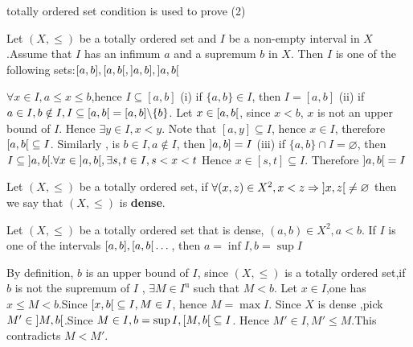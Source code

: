 \documentclass{book}
\numberwithin{equation}{section}
\begin{document}
\begin{remark}
    totally ordered set condition is used to prove (2)
\end{remark}
\begin{propositionenv}
   Let $(X,\le )$ be a totally ordered set and $I $ be a  non-empty interval in $X$  .Assume that $I$ has an infimum $a$ and a supremum $b$ in $X$. Then $I$ is one of the following sets:$[a,b],\interval[open right]{a}{b},\interval[open left]{a}{b},\interval[open]{a}{b}$
\end{propositionenv}
\begin{proofenv}
    $\forall x\in I ,a\le x\le b $,hence $I\subseteq [a,b]$
    \newline
    (i) if $\{a,b\}\in I$, then $I=[a,b]$
    \newline
    (ii) if $a\in I, b\notin I,I\subseteq\interval[open right]{a}{b}=[a,b]\backslash\{b\}$. Let $x\in \interval[open right]{a}{b}$, since $x<b$, $x$ is not an upper bound of $I$. Hence $\exists y\in I, x<y$. Note that $[a,y]\subseteq I$, hence $x\in I$, therefore $\interval[open right]{a}{b}\subseteq I$. Similarly , is $b\in I,a\notin I$, then $\interval[open left]{a}{b}=I$
    \newline
    (iii) if $\{a,b\}\cap I=\varnothing$, then $I\subseteq\interval[open]{a}{b} .\forall x\in \interval[open]{a}{b},\exists s,t\in I,s<x<t$ Hence $x\in [s,t]\subseteq I$. Therefore $\interval[open]{a}{b}=I$

\end{proofenv}
\begin{definitionenv}[Dense]
    Let $(X,\le )$ be a totally ordered set, if $\forall (x,z)\in X^2,x<z\Rightarrow \interval[open]{x}{z}\not=\varnothing$ then we say that $(X,\le)$ is \textbf{dense}.
\end{definitionenv}
\begin{propositionenv}
    Let $(X,\le )$ be a totally ordered set that is dense, $(a,b)\in X^2,a<b$. If $I$ is one of the intervals $[a,b],\interval[open right]{a}{b}\dots$, then $a=\inf I,b=\sup I$
\end{propositionenv}
\begin{proofenv}
    By definition, $b$ is an upper bound of $I$, since $(X,\le)$ is a totally ordered set,if $b$ is not the supremum of $I$ , $\exists M\in I^\mathrm{u}$ such that $M<b$.
    Let $x\in I$,one has $x\le M <b$.Since $\interval[open right]{x}{b}\subseteq I,M\in I$, hence $M=\max I$. Since $X$ is dense ,pick $M'\in \interval[open]{M}{b}$.Since $M\in I,b=\sup I,\interval[open right]{M}{b}\subseteq I$. Hence $M'\in I,M'\le M$.This contradicts $M<M'$.
\end{proofenv}
\end{document}
